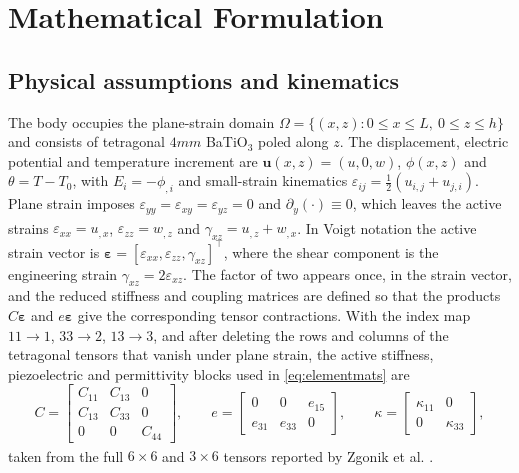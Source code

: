 \documentclass[a4paper, 11pt, twoside]{article}
\newcommand{\supercite}[1]{\!\!\textsuperscript{\cite{#1}}}
\begin{document}
\section{Mathematical Formulation}
\label{sec:theory}

\subsection{Physical assumptions and kinematics}

The body occupies the plane-strain domain $\Omega=\{(x,z):0\le x\le L,\ 0\le z\le h\}$
and consists of tetragonal $4mm$ BaTiO$_3$ poled along $z$. The displacement, electric
potential and temperature increment are $\bm u(x,z)=(u,0,w)$, $\phi(x,z)$ and
$\theta=T-T_0$, with $E_i=-\phi_{,i}$ and small-strain kinematics
$\varepsilon_{ij}=\tfrac12(u_{i,j}+u_{j,i})$. Plane strain imposes
$\varepsilon_{yy}=\varepsilon_{xy}=\varepsilon_{yz}=0$ and $\partial_y(\cdot)\equiv0$,
which leaves the active strains $\varepsilon_{xx}=u_{,x}$, $\varepsilon_{zz}=w_{,z}$
and $\gamma_{xz}=u_{,z}+w_{,x}$. In Voigt notation \supercite{Nye1985,IEEE176} the active
strain vector is $\bm\varepsilon=[\varepsilon_{xx},\varepsilon_{zz},\gamma_{xz}]^\top$,
where the shear component is the engineering strain $\gamma_{xz}=2\varepsilon_{xz}$.
The factor of two appears once, in the strain vector, and the reduced stiffness and
coupling matrices are defined so that the products $C\bm\varepsilon$ and
$e\bm\varepsilon$ give the corresponding tensor contractions. With the index map
$11\to1$, $33\to2$, $13\to3$, and after deleting the rows and columns of the tetragonal
tensors that vanish under plane strain, the active stiffness, piezoelectric and
permittivity blocks used in \eqref{eq:elementmats} are
\begin{equation}
C=\begin{bmatrix}C_{11}&C_{13}&0\\C_{13}&C_{33}&0\\0&0&C_{44}\end{bmatrix},
\qquad
e=\begin{bmatrix}0&0&e_{15}\\e_{31}&e_{33}&0\end{bmatrix},
\qquad
\kappa=\begin{bmatrix}\kappa_{11}&0\\0&\kappa_{33}\end{bmatrix},
\label{eq:voigtblocks}
\end{equation}
taken from the full $6\times6$ and $3\times6$ tensors reported by Zgonik et al.
\supercite{Zgonik1994}.
\end{document}
